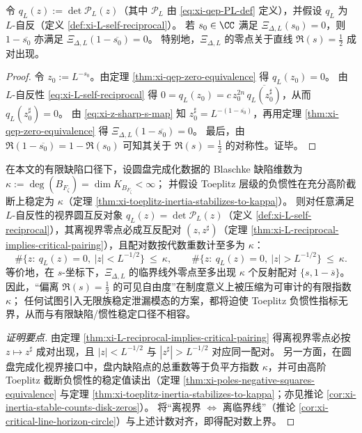 \begin{theorem}\label{thm:xi-L-reciprocal-implies-critical-pairing}
令 \(q_L(z):=\det \mathcal{P}_L(z)\)（其中 \(\mathcal{P}_L\) 由 \eqref{eq:xi-qep-PL-def} 定义），并假设 \(q_L\) 为 \(L\)-自反（定义 \ref{def:xi-L-self-reciprocal}）。
若 \(s_0\in\CC\) 满足 \(\Xi_{\Delta,L}(s_0)=0\)，则 \(1-\overline{s_0}\) 亦满足 \(\Xi_{\Delta,L}(1-\overline{s_0})=0\)。
特别地，\(\Xi_{\Delta,L}\) 的零点关于直线 \(\Re(s)=\tfrac12\) 成对出现。
\end{theorem}

\begin{proof}
令 \(z_0:=L^{-s_0}\)。由定理 \ref{thm:xi-qep-zero-equivalence} 得 \(q_L(z_0)=0\)。
由 \(L\)-自反性 \eqref{eq:xi-L-self-reciprocal} 得
\(
0=q_L(z_0)=c\,z_0^{2n}\,\overline{q_L(z_0^\sharp)}
\)，从而 \(q_L(z_0^\sharp)=0\)。
由 \eqref{eq:xi-z-sharp-s-map} 知 \(z_0^\sharp=L^{-(1-\overline{s_0})}\)，再用定理 \ref{thm:xi-qep-zero-equivalence} 得 \(\Xi_{\Delta,L}(1-\overline{s_0})=0\)。
最后，由 \(\Re(1-\overline{s_0})=1-\Re(s_0)\) 可知其关于 \(\Re(s)=\tfrac12\) 的对称性。证毕。
\end{proof}

\begin{corollary}\label{cor:xi-horizon-offcircle-pair-bound-by-kappa}
在本文的有限缺陷口径下，设圆盘完成化数据的 Blaschke 缺陷维数为
\(
\kappa:=\deg(B_{F_{\zeta}})=\dim K_{B_{F_{\zeta}}}<\infty
\)；
并假设 Toeplitz 层级的负惯性在充分高阶截断上稳定为 \(\kappa\)（定理 \ref{thm:xi-toeplitz-inertia-stabilizes-to-kappa}）。
则对任意满足 \(L\)-自反性的视界圆互反对象 \(q_L(z)=\det\mathcal P_L(z)\)（定义 \ref{def:xi-L-self-reciprocal}），其离视界零点必成互反配对 \((z,z^\sharp)\)（定理 \ref{thm:xi-L-reciprocal-implies-critical-pairing}），且配对数按代数重数计至多为 \(\kappa\)：
\[
\#\{z:\ q_L(z)=0,\ |z|<L^{-1/2}\}\ \le\ \kappa,
\qquad
\#\{z:\ q_L(z)=0,\ |z|>L^{-1/2}\}\ \le\ \kappa.
\]
等价地，在 \(s\)-坐标下，\(\Xi_{\Delta,L}\) 的临界线外零点至多出现 \(\kappa\) 个反射配对 \(\{s,1-\overline s\}\)。
因此，“偏离 \(\Re(s)=\tfrac12\) 的可见自由度”在制度意义上被压缩为可审计的有限指数 \(\kappa\)；
任何试图引入无限族稳定泄漏模态的方案，都将迫使 Toeplitz 负惯性指标无界，从而与有限缺陷/惯性稳定口径不相容。
\end{corollary}
\begin{proof}[证明要点]
由定理 \ref{thm:xi-L-reciprocal-implies-critical-pairing} 得离视界零点必按 \(z\mapsto z^\sharp\) 成对出现，且 \(|z|<L^{-1/2}\) 与 \(|z^\sharp|>L^{-1/2}\) 对应同一配对。
另一方面，在圆盘完成化视界接口中，盘内缺陷点的总重数等于负平方指数 \(\kappa\)，并可由高阶 Toeplitz 截断负惯性的稳定值读出（定理 \ref{thm:xi-poles-negative-squares-equivalence} 与定理 \ref{thm:xi-toeplitz-inertia-stabilizes-to-kappa}；亦见推论 \ref{cor:xi-inertia-stable-counts-disk-zeros}）。
将“离视界 \(\Longleftrightarrow\) 离临界线”（推论 \ref{cor:xi-critical-line-horizon-circle}）与上述计数对齐，即得配对数上界。
\end{proof}

